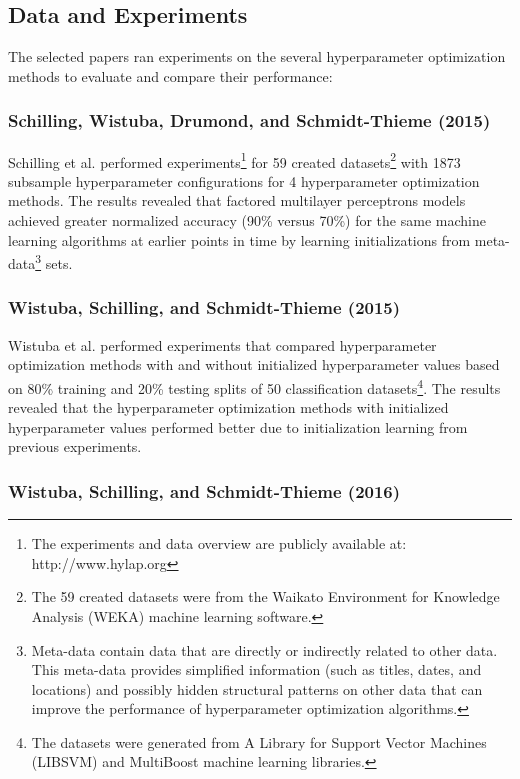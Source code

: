 \subsection{Data and Experiments} \label{data-and-experiments}

The selected papers ran experiments on the several hyperparameter optimization methods to evaluate and compare their performance:

\subsubsection{Schilling, Wistuba, Drumond, and Schmidt-Thieme (2015)}

Schilling et al. \cite{Schilling:2015} performed experiments\footnote{The experiments and data overview are publicly available at: http://www.hylap.org} for 59 created datasets\footnote{The 59 created datasets were from the Waikato Environment for Knowledge Analysis (WEKA) \cite{Hall:2009} machine learning software.} with 1873 subsample hyperparameter configurations for 4 hyperparameter optimization methods. The results revealed that factored multilayer perceptrons models achieved greater normalized accuracy (90\% versus 70\%) for the same machine learning algorithms at earlier points in time by learning initializations from meta-data\footnote{Meta-data contain data that are directly or indirectly related to other data. This meta-data provides simplified information (such as titles, dates, and locations) and possibly hidden structural patterns on other data that can improve the performance of hyperparameter optimization algorithms.} sets.

\subsubsection{Wistuba, Schilling, and Schmidt-Thieme (2015)}

Wistuba et al. \cite{Wistuba:2015} performed experiments that compared hyperparameter optimization methods with and without initialized hyperparameter values based on 80\% training and 20\% testing splits of 50 classification datasets\footnote{The datasets were generated from A Library for Support Vector Machines (LIBSVM) \cite{Chang:2011} and MultiBoost \cite{Benbouzid:2012} machine learning libraries.}. The results revealed that the hyperparameter optimization methods with initialized hyperparameter values performed better due to initialization learning from previous experiments.

\subsubsection{Wistuba, Schilling, and Schmidt-Thieme (2016)}

